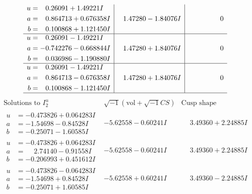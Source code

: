 \documentclass[1p]{elsarticle_modified}
\theoremstyle{definition}
\newcommand{\I}{\sqrt{-1}}
\begin{document}
$$\begin{array}{c|c|c}
\begin{aligned}
u &= \phantom{-}0.26091 + 1.49221 I \\
a &= \phantom{-}0.864713 + 0.676358 I \\
b &= \phantom{-}0.100868 + 1.121450 I\end{aligned}
 & \phantom{-}1.47280 - 1.84076 I & \phantom{-0.000000 } 0 \\ \hline\begin{aligned}
u &= \phantom{-}0.26091 - 1.49221 I \\
a &= -0.742276 - 0.668844 I \\
b &= \phantom{-}0.036986 - 1.190880 I\end{aligned}
 & \phantom{-}1.47280 + 1.84076 I & \phantom{-0.000000 } 0 \\ \hline\begin{aligned}
u &= \phantom{-}0.26091 - 1.49221 I \\
a &= \phantom{-}0.864713 - 0.676358 I \\
b &= \phantom{-}0.100868 - 1.121450 I\end{aligned}
 & \phantom{-}1.47280 + 1.84076 I & \phantom{-0.000000 } 0\\
 \hline 
 \end{array}$$\newpage$$\begin{array}{c|c|c}  
\text{Solutions to }I^u_{2}& \I (\text{vol} + \sqrt{-1}CS) & \text{Cusp shape}\\
 \hline 
\begin{aligned}
u &= -0.473826 + 0.064283 I \\
a &= -1.54698 - 0.84528 I \\
b &= -0.25071 - 1.60585 I\end{aligned}
 & -5.62558 - 0.60241 I & \phantom{-}3.49360 + 2.24885 I \\ \hline\begin{aligned}
u &= -0.473826 + 0.064283 I \\
a &= \phantom{-}2.74140 - 0.91558 I \\
b &= -0.206993 + 0.451612 I\end{aligned}
 & -5.62558 - 0.60241 I & \phantom{-}3.49360 + 2.24885 I \\ \hline\begin{aligned}
u &= -0.473826 - 0.064283 I \\
a &= -1.54698 + 0.84528 I \\
b &= -0.25071 + 1.60585 I\end{aligned}
 & -5.62558 + 0.60241 I & \phantom{-}3.49360 - 2.24885 I \\ \hline\begin{aligned}

\end{aligned}
\end{array}$$
\end{document}
